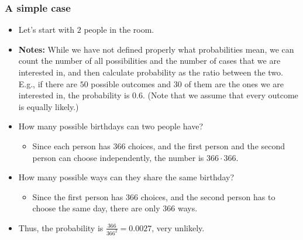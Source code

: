 \begin{frame}\frametitle{A simple case}
  \begin{itemize}
  \item Let's start with $2$ people in the room.
    \pause
  \item {\small {\bf Notes:} While we have not defined properly what
    probabilities mean, we can count the number of all possibilities
    and the number of cases that we are interested in, and then
    calculate probability as the ratio between the two.  \pause E.g.,
    if there are $50$ possible outcomes and $30$ of them are the ones
    we are interested in, the probability is $0.6$. \pause (Note that
    we assume that every outcome is equally likely.)}  \pause
  \item How many possible birthdays can two people have? \pause
    \begin{itemize}
    \item Since each person has $366$ choices, and the first person
      and the second person can choose independently, the number is
      $366\cdot 366$.
    \end{itemize}
    \pause
  \item How many possible ways can they share the same birthday?
    \pause
    \begin{itemize}
    \item Since the first person has $366$ choices, and the second
      person has to choose the same day, there are only $366$ ways.
    \end{itemize}
    \pause
  \item Thus, the probability is $\frac{366}{366^2} = 0.0027$, very
    unlikely.
  \end{itemize}
\end{frame}

